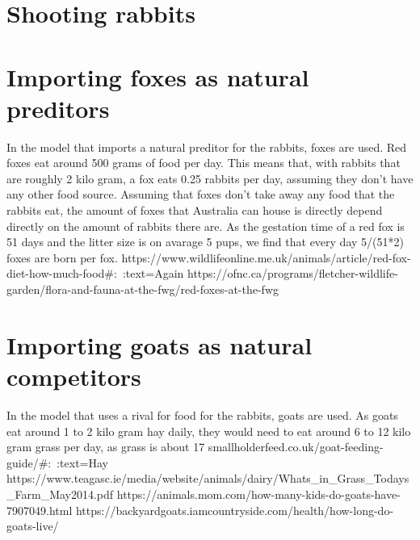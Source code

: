 \documentclass{article}
\begin{document}
\section{Shooting rabbits}

\section{Importing foxes as natural preditors}
In the model that imports a natural preditor for the rabbits, foxes are used. Red foxes  eat around 500 grams of food per day. This means that, with rabbits that are roughly 2 kilo gram, a fox eats 0.25 rabbits per day, assuming they don't have any other food source. Assuming that foxes don't take away any food that the rabbits eat, the amount of foxes that Australia can house is directly depend directly on the amount of rabbits there are. As the gestation time of a red fox is 51 days and the litter size is on avarage 5 pups, we find that every day 5/(51*2) foxes are born per fox.
https://www.wildlifeonline.me.uk/animals/article/red-fox-diet-how-much-food#:~:text=Again%
https://ofnc.ca/programs/fletcher-wildlife-garden/flora-and-fauna-at-the-fwg/red-foxes-at-the-fwg

\section{Importing goats as natural competitors}
In the model that uses a rival for food for the rabbits, goats are used. As goats eat around 1 to 2 kilo gram hay daily, they would need to eat around 6 to 12 kilo gram grass per day, as grass is about 17%
smallholderfeed.co.uk/goat-feeding-guide/#:~:text=Hay%
https://www.teagasc.ie/media/website/animals/dairy/Whats_in_Grass_Todays_Farm_May2014.pdf
https://animals.mom.com/how-many-kids-do-goats-have-7907049.html
https://backyardgoats.iamcountryside.com/health/how-long-do-goats-live/
\end{document}

